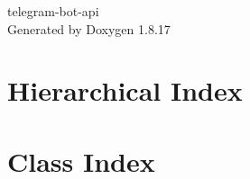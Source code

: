 \let\mypdfximage\pdfximage\def\pdfximage{\immediate\mypdfximage}\documentclass[twoside]{book}
\newcommand{\+}{\discretionary{\mbox{\scriptsize$\hookleftarrow$}}{}{}}
\newcommand{\clearemptydoublepage}{%
  \newpage{\pagestyle{empty}\cleardoublepage}%
}
\begin{document}
\hypersetup{pageanchor=false,
             bookmarksnumbered=true,
             pdfencoding=unicode
            }
\begin{titlepage}
\vspace*{7cm}
\begin{center}%
{\Large telegram-\/bot-\/api }\\
\vspace*{1cm}
{\large Generated by Doxygen 1.8.17}\\
\end{center}
\end{titlepage}
\clearemptydoublepage
{}
\tableofcontents
\clearemptydoublepage
{}
\hypersetup{pageanchor=true}

\chapter{Hierarchical Index}

\chapter{Class Index}

\end{document}
